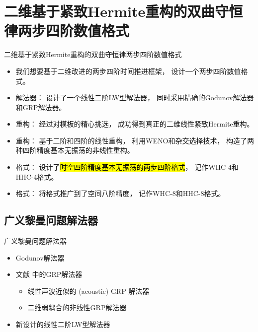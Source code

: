 \documentclass[aspectratio=169]{beamer}
\begin{document}
\section[二维两步四阶数值格式]{二维基于紧致Hermite重构的双曲守恒律两步四阶数值格式}

\begin{frame}{二维基于紧致Hermite重构的双曲守恒律两步四阶数值格式}
  
  \begin{itemize}[<+->]
    \item 我们想要基于二维改进的两步四阶时间推进框架，
          设计一个两步四阶数值格式。
          
    \item 解法器：
          设计了一个线性二阶LW型解法器，
          同时采用精确的Godunov解法器和GRP解法器。
          
    \item 重构：
          经过对模板的精心挑选，
          成功得到真正的二维线性紧致Hermite重构。
          
    \item 重构：
          基于二阶和四阶的线性重构，
          利用WENO和杂交选择技术，
          构造了两种四阶精度基本无振荡的非线性重构。
          
    \item 格式：
          设计了\hl{时空四阶精度基本无振荡的两步四阶格式}，
          记作WHC-4和HHC-4格式。
          
    \item 格式：
          将格式推广到了空间八阶精度，
          记作WHC-8和HHC-8格式。
  \end{itemize}
  
\end{frame}

\subsection{广义黎曼问题解法器}

\begin{frame}{广义黎曼问题解法器}
  
  \begin{itemize}[<+->]
    \item Godunov解法器
          
    \item 文献 \citep{GRP_qi} 中的GRP解法器
          
          \begin{itemize}
            \item 线性声波近似的 (acoustic) GRP 解法器
                  
            \item 二维弱耦合的非线性GRP解法器
          \end{itemize}
          
    \item 新设计的线性二阶LW型解法器
  \end{itemize}
  
\end{frame}
\end{document}
